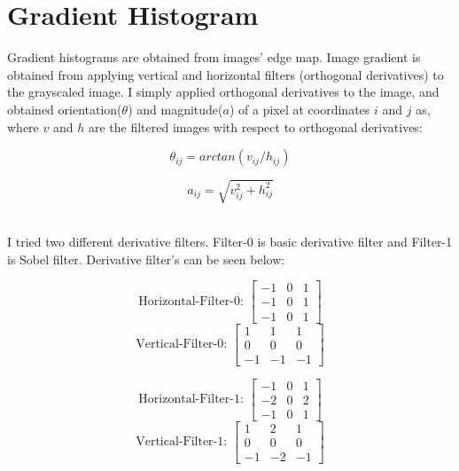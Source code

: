\documentclass[12pt]{article}
\begin{document}
\section{Gradient Histogram}
\qquad Gradient histograms are obtained from images' edge map. Image gradient is obtained from applying vertical and horizontal filters (orthogonal derivatives) to the grayscaled image. I simply applied orthogonal derivatives to the image, and obtained orientation($\theta$) and magnitude($a$) of a pixel at coordinates $i$ and $j$ as, where $v$ and $h$ are the filtered images with respect to orthogonal derivatives:

\begin{minipage}{\textwidth}
	\centering
	\begin{minipage}{0.25\textwidth}
		\begin{equation}
		\theta_{ij}=arctan(v_{ij}/h_{ij})
		\end{equation}
	\end{minipage}
	\begin{minipage}{0.25\textwidth}
		\begin{equation}
		a_{ij}=\sqrt{v^{2}_{ij}+h^{2}_{ij}}
		\end{equation}
	\end{minipage}
\end{minipage} \\

\quad I tried two different derivative filters. Filter-0 is basic derivative filter and Filter-1 is Sobel filter. Derivative filter's can be seen below: \\

\begin{minipage}{\textwidth}
	\begin{minipage}{0.49\textwidth}
	\[\text{Horizontal-Filter-0: }
	\begin{bmatrix}
	    -1 & 0 & 1 \\
	    -1 & 0 & 1 \\
	    -1 & 0 & 1
	\end{bmatrix}
	\]
	\linebreak
	\[
	\text{Vertical-Filter-0: }
	\begin{bmatrix}
	    1 & 1 & 1 \\
	    0 & 0 & 0 \\
	    -1 & -1 & -1
	\end{bmatrix}
	\]
	\end{minipage}
	\begin{minipage}{0.25\textwidth}
	\[\text{Horizontal-Filter-1: }
	\begin{bmatrix}
	    -1 & 0 & 1 \\
	    -2 & 0 & 2 \\
	    -1 & 0 & 1
	\end{bmatrix}
	\]
	\linebreak
	\[
	\text{Vertical-Filter-1: }
	\begin{bmatrix}
	    1 & 2 & 1 \\
	    0 & 0 & 0 \\
	    -1 & -2 & -1
	\end{bmatrix}
	\]
	\end{minipage}
\end{minipage}
\end{document}
